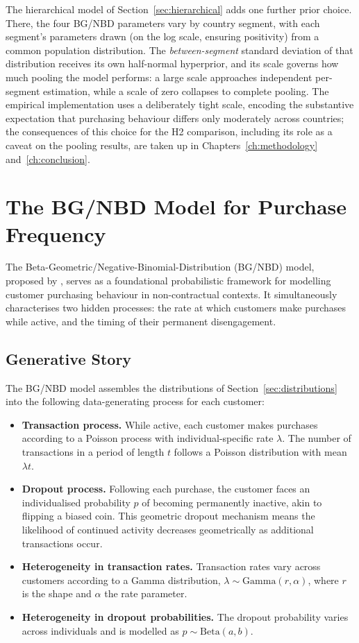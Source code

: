 \documentclass[12pt, a4paper, oneside]{report}
\begin{document}
The hierarchical model of Section~\ref{sec:hierarchical} adds one further prior choice. There, the four BG/NBD parameters vary by country segment, with each segment's parameters drawn (on the log scale, ensuring positivity) from a common population distribution. The \emph{between-segment} standard deviation of that distribution receives its own half-normal hyperprior, and its scale governs how much pooling the model performs: a large scale approaches independent per-segment estimation, while a scale of zero collapses to complete pooling. The empirical implementation uses a deliberately tight scale, encoding the substantive expectation that purchasing behaviour differs only moderately across countries; the consequences of this choice for the H2 comparison, including its role as a caveat on the pooling results, are taken up in Chapters~\ref{ch:methodology} and~\ref{ch:conclusion}.

\section{The BG/NBD Model for Purchase Frequency}
\label{sec:bgnbd}

The Beta-Geometric/Negative-Binomial-Distribution (BG/NBD) model, proposed by \textcite{fader2005}, serves as a foundational probabilistic framework for modelling customer purchasing behaviour in non-contractual contexts. It simultaneously characterises two hidden processes: the rate at which customers make purchases while active, and the timing of their permanent disengagement.

\subsection{Generative Story}
\label{sec:bgnbd-generative}

The BG/NBD model assembles the distributions of Section~\ref{sec:distributions} into the following data-generating process for each customer:

\begin{itemize}
  \item \textbf{Transaction process.} While active, each customer makes purchases according to a Poisson process with individual-specific rate $\lambda$. The number of transactions in a period of length $t$ follows a Poisson distribution with mean $\lambda t$.
  \item \textbf{Dropout process.} Following each purchase, the customer faces an individualised probability $p$ of becoming permanently inactive, akin to flipping a biased coin. This geometric dropout mechanism means the likelihood of continued activity decreases geometrically as additional transactions occur.
  \item \textbf{Heterogeneity in transaction rates.} Transaction rates vary across customers according to a Gamma distribution, $\lambda \sim \text{Gamma}(r, \alpha)$, where $r$ is the shape and $\alpha$ the rate parameter.
  \item \textbf{Heterogeneity in dropout probabilities.} The dropout probability varies across individuals and is modelled as $p \sim \text{Beta}(a, b)$.
\end{itemize}
\end{document}
